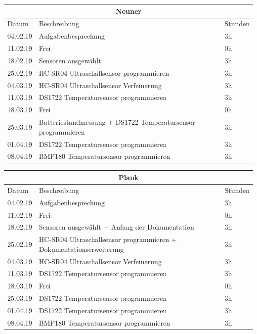 \documentclass[12pt,a4paper]{article}
\begin{document}
\begin{table}[H]
\centering 
\begin{tabular}{|l|l|l|}
\hline
\multicolumn{3}{|c|}{Neuner}   \\ \hline
Datum & Beschreibung & Stunden \\ \hline
04.02.19 & Aufgabenbesprechung & 3h \\ \hline
11.02.19 & Frei & 0h \\ \hline
18.02.19 & Sensoren ausgewählt & 3h \\ \hline
25.02.19 & HC-SR04 Ultraschallsensor programmieren & 3h \\ \hline
04.03.19 & HC-SR04 Ultraschallsensor Verfeinerung& 3h \\ \hline
11.03.19 & DS1722 Temperatursensor programmieren & 3h \\ \hline
18.03.19 & Frei & 0h\\ \hline
25.03.19 & Batteriestandmessung + DS1722 Temperatursensor programmieren & 3h \\ \hline
01.04.19 & DS1722 Temperatursensor programmieren& 3h \\ \hline
08.04.19 & BMP180 Temperatursensor programmieren & 3h \\ \hline
\end{tabular}
\end{table}

\begin{table}[H]
\centering 
\begin{tabular}{|l|l|l|}
\hline
\multicolumn{3}{|c|}{Plank}   \\ \hline
Datum & Beschreibung & Stunden \\ \hline
04.02.19 & Aufgabenbesprechung & 3h \\ \hline
11.02.19 & Frei & 0h \\ \hline
18.02.19 & Sensoren ausgewählt + Anfang der Dokumentation & 3h \\ \hline
25.02.19 & HC-SR04 Ultraschallsensor programmieren + Dokumentationserweiterung & 3h \\ \hline
04.03.19 & HC-SR04 Ultraschallsensor Verfeinerung& 3h \\ \hline
11.03.19 & DS1722 Temperatursensor programmieren & 3h \\ \hline
18.03.19 & Frei & 0h\\ \hline
25.03.19 & DS1722 Temperatursensor programmieren & 3h \\ \hline
01.04.19 & DS1722 Temperatursensor programmieren& 3h \\ \hline
08.04.19 & BMP180 Temperatursensor programmieren & 3h \\ \hline
\end{tabular}
\end{table}
\end{document}
